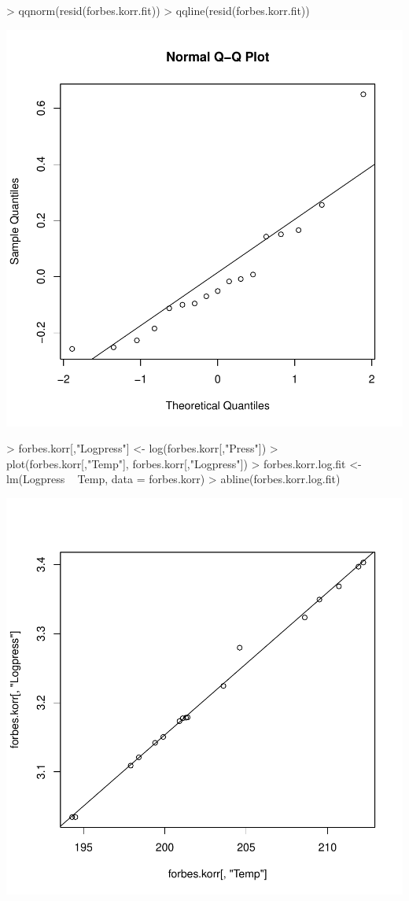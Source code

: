 \begin{Schunk}
\begin{Sinput}
> qqnorm(resid(forbes.korr.fit))
> qqline(resid(forbes.korr.fit))
\end{Sinput}
\end{Schunk}
\includegraphics{sw12_1-011}
\begin{Schunk}
\begin{Sinput}
> forbes.korr[,"Logpress"] <- log(forbes.korr[,"Press"])
> plot(forbes.korr[,"Temp"], forbes.korr[,"Logpress"])
> forbes.korr.log.fit <- lm(Logpress ~ Temp, data = forbes.korr)
> abline(forbes.korr.log.fit)
\end{Sinput}
\end{Schunk}
\includegraphics{sw12_1-012}
